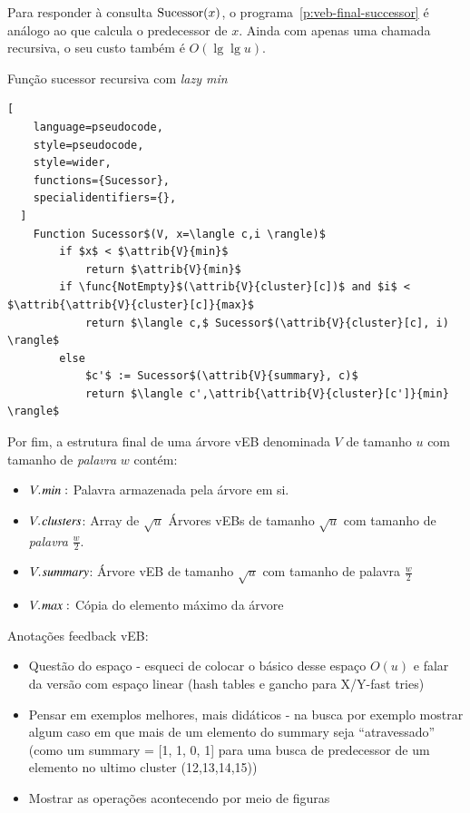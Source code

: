 Para responder à consulta $\operatorname{Sucessor}(x)$, o programa~\ref{p:veb-final-successor}
é análogo ao que calcula o predecessor de $x$. Ainda com apenas uma chamada
recursiva, o seu custo também é $O(\lg \lg u)$.

\begin{programruledcaption}{Função sucessor recursiva com \emph{lazy min} \label{p:veb-final-successor}}
  \begin{lstlisting}[
    language=pseudocode,
    style=pseudocode,
    style=wider,
    functions={Sucessor},
    specialidentifiers={},
  ]
    Function Sucessor$(V, x=\langle c,i \rangle)$
        if $x$ < $\attrib{V}{min}$
            return $\attrib{V}{min}$
        if \func{NotEmpty}$(\attrib{V}{cluster}[c])$ and $i$ < $\attrib{\attrib{V}{cluster}[c]}{max}$
            return $\langle c,$ Sucessor$(\attrib{V}{cluster}[c], i) \rangle$
        else
            $c'$ := Sucessor$(\attrib{V}{summary}, c)$
            return $\langle c',\attrib{\attrib{V}{cluster}[c']}{min} \rangle$
  \end{lstlisting}
\end{programruledcaption}

Por fim, a estrutura final de uma árvore vEB denominada $V$ de tamanho $u$ com
tamanho de \textit{palavra} $w$ contém:

\begin{itemize}
\item $\attrib{V}{min}:$ Palavra armazenada pela árvore em si.
\item $\attrib{V}{clusters}$: Array de $\sqrt u$ Árvores vEBs de tamanho $\sqrt
u$ com tamanho de \textit{palavra} $\frac{w}{2}$. 
\item $\attrib{V}{summary}$: Árvore vEB de tamanho $\sqrt{u}$ com tamanho de
palavra $\frac{w}{2}$
\item $\attrib{V}{max}:$ Cópia do elemento máximo da árvore
\end{itemize}

\hfill

Anotações feedback vEB:
\begin{itemize}
    \item Questão do espaço - esqueci de colocar o básico desse espaço $O(u)$ e
    falar da versão com espaço linear (hash tables e gancho para X/Y-fast tries)
    \item Pensar em exemplos melhores, mais didáticos - na busca por exemplo
    mostrar algum caso em que mais de um elemento do summary seja
    ``atravessado''  (como um summary = [1, 1, 0, 1] para uma busca de
    predecessor de um elemento no ultimo cluster (12,13,14,15))
    \item Mostrar as operações acontecendo por meio de figuras
\end{itemize}

